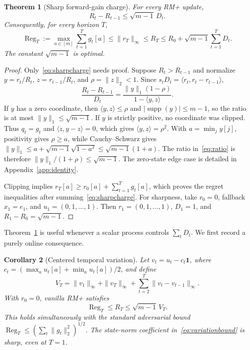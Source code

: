 \documentclass{article}
\newtheorem{theorem}{Theorem}
\newtheorem{corollary}[theorem]{Corollary}
\newcommand{\one}{\mathbf 1}
\newcommand{\Reg}{\operatorname{Reg}}
\begin{document}
\begin{theorem}[Sharp forward-gain charge]
\label{thm:charge}
For every RM+ update,
\begin{equation}
R_t-R_{t-1}\le\sqrt{m-1}\,D_t.
\label{eq:sharpcharge}
\end{equation}
Consequently, for every horizon $T$,
\begin{equation}
\Reg_T:=\max_{a\in[m]}\sum_{t=1}^Tg_t[a]
\le\|r_T\|_\infty\le R_T
\le R_0+\sqrt{m-1}\sum_{t=1}^TD_t.
\label{eq:pathgain}
\end{equation}
The constant $\sqrt{m-1}$ is optimal.
\end{theorem}

\begin{proof}
Only~\eqref{eq:sharpcharge} needs proof. Suppose $R_t>R_{t-1}$ and normalize $y=r_t/R_t$, $z=r_{t-1}/R_t$, and $\rho=\|z\|_2<1$. Since $s_tD_t=\langle r_t,r_t-r_{t-1}\rangle$,
\begin{equation}
\frac{R_t-R_{t-1}}{D_t}=\frac{\|y\|_1(1-\rho)}{1-\langle y,z\rangle}.
\label{eq:ratio}
\end{equation}
If $y$ has a zero coordinate, then $\langle y,z\rangle\le\rho$ and $|\operatorname{supp}(y)|\le m-1$, so the ratio is at most $\|y\|_1\le\sqrt{m-1}$. If $y$ is strictly positive, no coordinate was clipped. Thus $q_t=g_t$ and $\langle z,y-z\rangle=0$, which gives $\langle y,z\rangle=\rho^2$. With $a=\min_jy[j]$, positivity gives $\rho\ge a$, while Cauchy--Schwarz gives $\|y\|_1\le a+\sqrt{m-1}\sqrt{1-a^2}\le\sqrt{m-1}(1+a)$. The ratio in~\eqref{eq:ratio} is therefore $\|y\|_1/(1+\rho)\le\sqrt{m-1}$. The zero-state edge case is detailed in Appendix~\ref{app:identity}.

Clipping implies $r_T[a]\ge r_0[a]+\sum_{t=1}^Tg_t[a]$, which proves the regret inequalities after summing~\eqref{eq:sharpcharge}. For sharpness, take $r_0=0$, fallback $x_1=e_1$, and $u_1=(0,1,\ldots,1)$. Then $r_1=(0,1,\ldots,1)$, $D_1=1$, and $R_1-R_0=\sqrt{m-1}$.
\end{proof}

Theorem~\ref{thm:charge} is useful whenever a scalar process controls $\sum_tD_t$. We first record a purely online consequence.

\begin{corollary}[Centered temporal variation]
\label{cor:variation}
Let $v_t=u_t-c_t\one$, where $c_t=(\max_a u_t[a]+\min_a u_t[a])/2$, and define
\begin{equation}
V_T=\|v_1\|_\infty+\|v_T\|_\infty+\sum_{t=2}^T\|v_t-v_{t-1}\|_\infty.
\label{eq:variation}
\end{equation}
With $r_0=0$, vanilla RM+ satisfies
\begin{equation}
\Reg_T\le R_T\le\sqrt{m-1}\,V_T.
\label{eq:variationbound}
\end{equation}
This holds simultaneously with the standard adversarial bound $\Reg_T\le(\sum_t\|g_t\|_2^2)^{1/2}$. The state-norm coefficient in~\eqref{eq:variationbound} is sharp, even at $T=1$.
\end{corollary}
\end{document}
